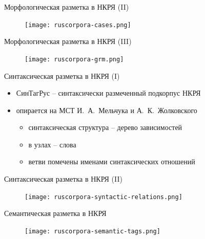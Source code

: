 \documentclass{beamer}
\begin{document}
\begin{frame}{Морфологическая разметка в НКРЯ (II)}
\begin{center}
	\begin{figure}[H]
		\texttt{[image: ruscorpora-cases.png]} 
	\end{figure}
\end{center}	
\end{frame}

\begin{frame}{Морфологическая разметка в НКРЯ (III)}
\begin{center}
	\begin{figure}[H]
		\texttt{[image: ruscorpora-grm.png]} 
	\end{figure}
\end{center}	
\end{frame}

\begin{frame}{Синтаксическая разметка в НКРЯ (I)}
\begin{itemize}
	\item СинТагРус -- синтаксически размеченный подкорпус НКРЯ
	\item опирается на МСТ И.~А.~Мельчука и А.~К.~Жолковского
	    \begin{itemize}
	        \item синтаксическая структура -- дерево зависимостей
	        \item в узлах -- слова
	        \item ветви помечены именами синтаксических отношений
	    \end{itemize}
\end{itemize}
\end{frame}

\begin{frame}{Синтаксическая разметка в НКРЯ (II)}
\begin{center}
	\begin{figure}[H]
		\texttt{[image: ruscorpora-syntactic-relations.png]} 
	\end{figure}
\end{center}	
\end{frame}

\begin{frame}{Семантическая разметка в НКРЯ}
\begin{center}
	\begin{figure}[H]
		\texttt{[image: ruscorpora-semantic-tags.png]} 
	\end{figure}
\end{center}
\end{frame}
\end{document}
